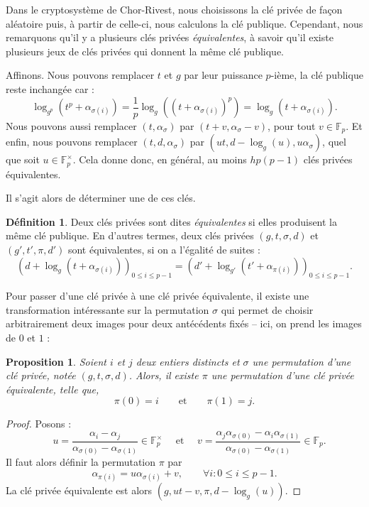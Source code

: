 \documentclass[a4paper, titlepage, 11pt]{article}
\newtheorem{prop}[theo]{Proposition}
\theoremstyle{definition}
\newtheorem{defi}[theo]{Définition}
\theoremstyle{remark}
\def\gf #1{\mathbb{F}_{#1}}
\begin{document}
Dans le cryptosystème de Chor-Rivest, nous choisissons la clé privée de façon aléatoire puis, à partir de celle-ci, nous calculons la clé publique. Cependant, nous remarquons qu'il y a plusieurs clés privées \textit{équivalentes}, à savoir qu'il existe plusieurs jeux de clés privées qui donnent la même clé publique.

Affinons. Nous pouvons remplacer $t$ et $g$ par leur puissance $p$-ième, la clé publique reste inchangée car :
$$\log_{g^p}\left(t^p + \alpha_{\sigma(i)}\right) = \frac{1}{p}\log_{g}\left(\left(t + \alpha_{\sigma(i)}\right)^p\right) = \log_{g}\left(t + \alpha_{\sigma(i)}\right).$$
Nous pouvons aussi remplacer $(t, \alpha_{\sigma})$ par $(t + v, \alpha_{\sigma} - v)$, pour tout $v \in \gf{p}$. Et enfin, nous pouvons remplacer $(t,d,\alpha_\sigma)$ par $(ut, d - \log_g(u), u\alpha_\sigma)$, quel que soit $u \in \gf{p}^\times$.
Cela donne donc, en général, au moins $hp(p-1)$ clés privées équivalentes.

Il s'agit alors de déterminer une de ces clés.

\begin{defi}
Deux clés privées sont dites \textit{équivalentes} si elles produisent la même clé publique. En d'autres termes, deux clés privées $(g,t,\sigma,d)$ et $(g',t',\pi ,d')$ sont équivalentes, si on a l'égalité de suites :
$$\left(d + \log_g(t + \alpha_{\sigma(i)})\right)_{0\leqslant i \leqslant p-1} = \left(d' + \log_{g'}(t' + \alpha_{\pi(i)})\right)_{0\leqslant i \leqslant p-1}.$$
\end{defi}

Pour passer d'une clé privée à une clé privée équivalente, il existe une transformation intéressante sur la permutation $\sigma$ qui permet de choisir arbitrairement deux images pour deux antécédents fixés -- ici, on prend les images de $0$ et $1$ :

\begin{prop}\label{prop:permutation}
Soient $i$ et $j$ deux entiers distincts et $\sigma$ une permutation d'une clé privée, notée $(g,t,\sigma,d)$. Alors, il existe $\pi$ une permutation d'une clé privée équivalente, telle que, $$\pi(0) = i \qquad \text{et}\qquad \pi(1) = j.$$
\end{prop}

\begin{proof}
Posons :
$$\quad u = \frac{\alpha_i - \alpha_j}{\alpha_{\sigma(0)}- \alpha_{\sigma(1)}} \in \gf{p}^\times \quad \text{ et } \quad v =  \frac{\alpha_j\alpha_{\sigma(0)} - \alpha_i\alpha_{\sigma(1)}}{\alpha_{\sigma(0)}- \alpha_{\sigma(1)}} \in \gf{p}.$$
Il faut alors définir la permutation $\pi$ par
$$\alpha_{\pi(i)} = u\alpha_{\sigma(i)} + v,\qquad \forall i : 0\leqslant i \leqslant p-1.$$
La clé privée équivalente est alors $\left(g, ut-v, \pi, d- \log_g(u)\right)$.
\end{proof}
\end{document}
